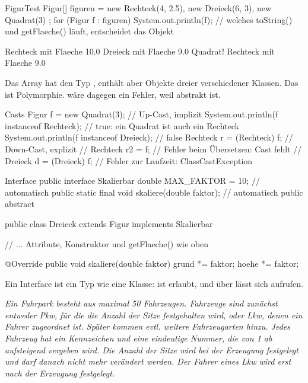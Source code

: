\begin{javacode}[Ausschnitt]{FigurTest}
Figur[] figuren = { new Rechteck(4, 2.5), new Dreieck(6, 3), new Quadrat(3) };
for (Figur f : figuren) {
	System.out.println(f);          // welches toString() und getFlaeche() läuft, entscheidet das Objekt
}
\end{javacode}
\begin{konsole}
Rechteck mit Flaeche 10.0
Dreieck mit Flaeche 9.0
Quadrat! Rechteck mit Flaeche 9.0
\end{konsole}
Das Array hat den Typ , enthält aber Objekte dreier verschiedener Klassen. Das ist Polymorphie.  wäre dagegen ein Fehler, weil  abstrakt ist.

\begin{javacode}[Ausschnitt]{Casts}
Figur f = new Quadrat(3);                       // Up-Cast, implizit
System.out.println(f instanceof Rechteck);      // true: ein Quadrat ist auch ein Rechteck
System.out.println(f instanceof Dreieck);       // false
Rechteck r = (Rechteck) f;                      // Down-Cast, explizit
// Rechteck r2 = f;                             // Fehler beim Übersetzen: Cast fehlt
// Dreieck d = (Dreieck) f;                     // Fehler zur Laufzeit: ClassCastException
\end{javacode}

\begin{javacode}[Ausschnitt]{Interface}
public interface Skalierbar {
	double MAX_FAKTOR = 10;                     // automatisch public static final
	void skaliere(double faktor);               // automatisch public abstract
}

public class Dreieck extends Figur implements Skalierbar {
	// ... Attribute, Konstruktor und getFlaeche() wie oben

	@Override
	public void skaliere(double faktor) {
		grund *= faktor;
		hoehe *= faktor;
	}
}
\end{javacode}
Ein Interface ist ein Typ wie eine Klasse:  ist erlaubt, und über  lässt sich  aufrufen.

\emph{Ein Fuhrpark besteht aus maximal 50 Fahrzeugen. Fahrzeuge sind zunächst entweder Pkw, für die die Anzahl der Sitze festgehalten wird, oder Lkw, denen ein Fahrer zugeordnet ist. Später kommen evtl. weitere Fahrzeugarten hinzu. Jedes Fahrzeug hat ein Kennzeichen und eine eindeutige Nummer, die von 1 ab aufsteigend vergeben wird. Die Anzahl der Sitze wird bei der Erzeugung festgelegt und darf danach nicht mehr verändert werden. Der Fahrer eines Lkw wird erst nach der Erzeugung festgelegt.}

